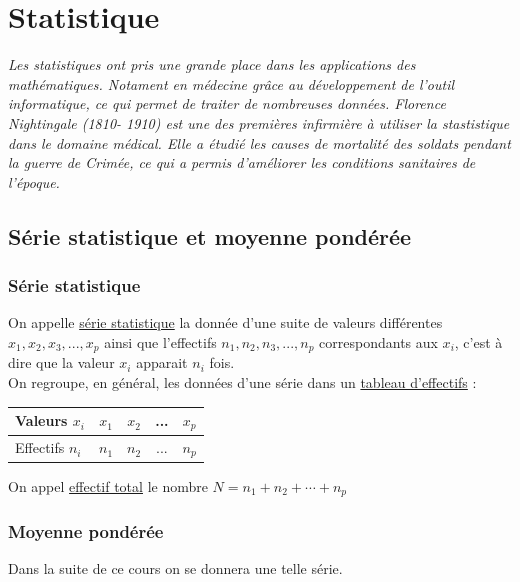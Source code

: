\documentclass[french]{book}
\begin{document}
 \setcounter{chapter}{9}
\chapter{Statistique}
\textit{Les statistiques ont pris une grande place dans les applications des mathématiques. Notament en médecine grâce au développement de l'outil informatique, ce qui permet de traiter de nombreuses données. Florence Nightingale (1810- 1910) est une des premières infirmière à utiliser la stastistique dans le domaine médical. Elle a étudié les causes de mortalité des soldats pendant la guerre de Crimée, ce qui a permis d'améliorer les conditions sanitaires de l'époque. } \\


\section{Série statistique et moyenne pondérée}
\subsection{Série statistique}
\begin{defn}
On appelle \underline{série statistique} la donnée d'une suite de valeurs différentes $x_1,x_2,x_3,...,x_p$ ainsi que l'effectifs $n_1,n_2,n_3,...,n_p$ correspondants aux $x_i$, c'est à dire que la valeur $x_i$ apparait $n_i$ fois.\\

On regroupe, en général, les données d'une série dans un \underline{tableau d'effectifs} :\\

\begin{center}


\begin{tabular}{|l|c|c|c|c|}
  \hline
  Valeurs $x_i$ & $x_1$ & $x_2$ & ... & $x_p$ \\
  \hline
 Effectifs $n_i$ & $n_1$ & $n_2$ & ... & $n_p$ \\
  \hline
\end{tabular} 
\end{center}
On appel \underline{effectif total} le nombre $N=n_1+n_2+ \cdots + n_p$
\end{defn}

\subsection{Moyenne pondérée}
Dans la suite de ce cours on se donnera une telle série.
\end{document}
